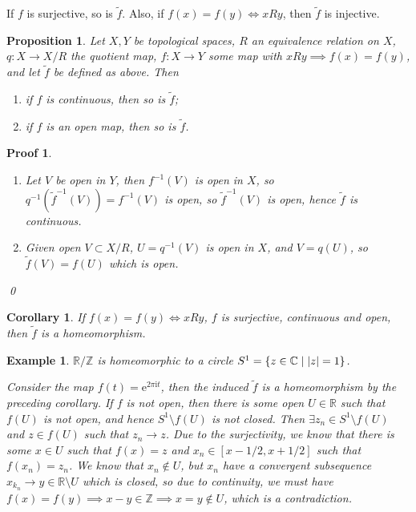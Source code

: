 \documentclass{article}
\theoremstyle{plain}\theoremheaderfont{\normalfont\itshape}\theorembodyfont{\rmfamily}\theoremseparator{.}\newtheorem*{rem}{Remark}\newtheorem*{ex}{Example}\newtheorem*{proof}{Proof}\newtheorem*{altp}{Alternative proof}
\theoremstyle{plain}\theoremheaderfont{\normalfont\bfseries}\theorembodyfont{\rmfamily}\theoremseparator{.}\newtheorem{thm}{Theorem}[section]\newtheorem{lem}[thm]{Lemma}\newtheorem{prop}[thm]{Proposition}\newtheorem*{cor}{Corollary}\newtheorem{defn}[thm]{Definition}\newtheorem{clm}[thm]{Claim}\newtheorem{clminproof}{Claim}
\theoremstyle{break}\theoremheaderfont{\normalfont\itshape}\theorembodyfont{\rmfamily}\theoremseparator{.\medskip}\newtheorem*{proofskip}{Proof}\newtheorem*{exs}{Examples}\newtheorem*{rems}{Remarks}
\theoremstyle{break}\theoremheaderfont{\normalfont\bfseries}\theorembodyfont{\rmfamily}\theoremseparator{.\medskip}\newtheorem{lemskip}[thm]{Lemma}\newtheorem{defnskip}[thm]{Definition}\newtheorem{propskip}[thm]{Proposition}\newtheorem{thmskip}[thm]{Theorem}
\newcommand{\qed}{\hfill\ensuremath{\Box}}
\newcommand{\ii}{\mathrm{i}}
\newcommand{\ee}{\mathrm{e}}
\begin{document}
    If \(f\) is surjective, so is \(\tilde{f}\). Also, if \(f(x)=f(y)\iff xRy\), then \(\tilde{f}\) is injective.

    \begin{prop}
        Let \(X,Y\) be topological spaces, \(R\) an equivalence relation on \(X\), \(q:X\to X/R\) the quotient map, \(f:X\to Y\) some map with \(xRy\implies f(x)=f(y)\), and let \(\tilde{f}\) be defined as above. Then
        \begin{enumerate}[label=(\roman*),topsep=0pt]
            \item if \(f\) is continuous, then so is \(\tilde{f}\);
            \item if \(f\) is an open map, then so is \(\tilde{f}\).
        \end{enumerate}
    \end{prop}
    \begin{proofskip}
        \begin{enumerate}[label=(\roman*),topsep=0pt]
            \item Let \(V\) be open in \(Y\), then \(f^{-1}(V)\) is open in \(X\), so \(q^{-1}(\tilde{f}^{-1}(V))=f^{-1}(V)\) is open, so \(\tilde{f}^{-1}(V)\) is open, hence \(\tilde{f}\) is continuous.
            \item Given open \(V\subset X/R\), \(U=q^{-1}(V)\) is open in \(X\), and \(V=q(U)\), so \(\tilde{f}(V)=f(U)\) which is open.
        \end{enumerate}\qed
    \end{proofskip}

    \begin{cor}
        If \(f(x)=f(y)\iff xRy\), \(f\) is surjective, continuous and open, then \(\tilde{f}\) is a homeomorphism.
    \end{cor}
    \begin{ex}
        \(\mathbb{R}/\mathbb{Z}\) is homeomorphic to a circle \(S^1=\{z\in\mathbb{C}\mid\abs{z}=1\}\). 
        
        Consider the map \(f(t)=\ee^{2\pi \ii t}\), then the induced \(\tilde{f}\) is a homeomorphism by the preceding corollary. If \(f\) is not open, then there is some open \(U\in\mathbb{R}\) such that \(f(U)\) is not open, and hence \(S^1\setminus f(U)\) is not closed. Then \(\exists z_n\in S^1\setminus f(U)\) and \(z\in f(U)\) such that \(z_n\to z\). Due to the surjectivity, we know that there is some \(x\in U\) such that \(f(x)=z\) and \(x_n\in[x-1/2,x+1/2]\) such that \(f(x_n)=z_n\). We know that \(x_n\not\in U\), but \(x_n\) have a convergent subsequence \(x_{k_n}\to y\in\mathbb{R}\setminus U\) which is closed, so due to continuity, we must have \(f(x)=f(y)\implies x-y\in\mathbb{Z}\implies x=y\not\in U\), which is a contradiction.
    \end{ex}
\end{document}
